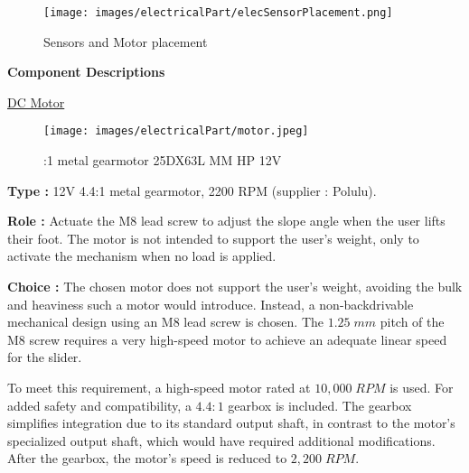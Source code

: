 \documentclass[lettersize,journal]{IEEEtran}
\begin{document}
\begin{figure}[!h]
    \centering
    \texttt{[image: images/electricalPart/elecSensorPlacement.png]}
    \caption{\centering Sensors and Motor placement}
    \label{fig:Electronic_placement}
\end{figure}

\noindent \textbf{Component Descriptions}
\bigskip

\noindent \underline{DC Motor}

\begin{figure}[!h]
    \centering
    \texttt{[image: images/electricalPart/motor.jpeg]}
    \caption{:1 metal gearmotor 25DX63L MM HP 12V}
    \label{fig:Electronic_placement}
\end{figure}


\noindent \textbf{Type :} 12V 4.4:1 metal gearmotor, 2200 RPM (supplier : Polulu). 

\medskip \noindent \textbf{Role :} Actuate the M8 lead screw to adjust the slope angle when the user lifts their foot. The motor is not intended to support the user's weight, only to activate the mechanism when no load is applied.

\medskip \noindent \textbf{Choice :}
The chosen motor does not support the user’s weight, avoiding the bulk and heaviness such a motor would introduce. Instead, a non-backdrivable mechanical design using an M8 lead screw is chosen. The $1.25 \;mm$ pitch of the M8 screw requires a very high-speed motor to achieve an adequate linear speed for the slider.

To meet this requirement, a high-speed motor rated at $10,000 \;RPM$ is used. For added safety and compatibility, a $4.4:1$ gearbox is included. The gearbox simplifies integration due to its standard output shaft, in contrast to the motor’s specialized output shaft, which would have required additional modifications. After the gearbox, the motor’s speed is reduced to $2,200 \;RPM$.


\end{document}
